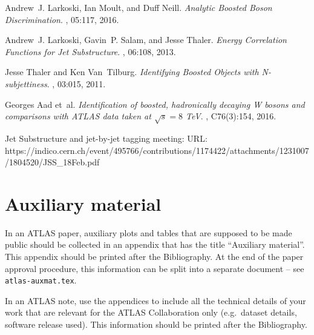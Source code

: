 \documentclass[UKenglish,texlive=2013]{\ATLASLATEXPATH atlasdoc}
\begin{document}
\begin{thebibliography}{9}
Andrew~J. Larkoski, Ian Moult, and Duff Neill.
\emph {Analytic Boosted Boson Discrimination}.
, 05:117, 2016.

Andrew~J. Larkoski, Gavin~P. Salam, and Jesse Thaler.
\emph {Energy Correlation Functions for Jet Substructure}.
, 06:108, 2013.

Jesse Thaler and Ken Van~Tilburg.
\emph {Identifying Boosted Objects with N-subjettiness}.
, 03:015, 2011.


Georges Aad et~al.
\emph {Identification of boosted, hadronically decaying W bosons and
  comparisons with ATLAS data taken at $\sqrt{s} = 8$ TeV}.
, C76(3):154, 2016.

Jet Substructure and jet-by-jet tagging meeting:
URL: https://indico.cern.ch/event/495766/contributions/1174422/attachments/1231007/1804520/JSS\_18Feb.pdf

\end{thebibliography}
\printbibliography
%
%

\clearpage
{}

\clearpage
\appendix
\part*{Auxiliary material}

In an ATLAS paper, auxiliary plots and tables that are supposed to be made public 
should be collected in an appendix that has the title \enquote{Auxiliary material}.
This appendix should be printed after the Bibliography.
At the end of the paper approval procedure, this information can be split into a separate document
-- see \texttt{atlas-auxmat.tex}.

In an ATLAS note, use the appendices to include all the technical details of your work
that are relevant for the ATLAS Collaboration only (e.g.\ dataset details, software release used).
This information should be printed after the Bibliography.
\end{document}
